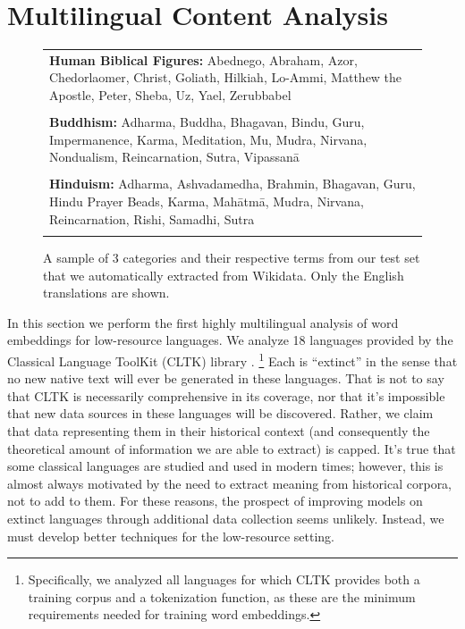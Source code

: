\documentclass[11pt,a4paper]{article}
\newcommand{\fixme}[1]{{\color{red}\itshape \textbf{FIXME:} {#1}}}
\begin{document}
\section{Multilingual Content Analysis}
\label{sec:mca}

\begin{figure}
\itshape
    \begin{tabular}{p{}}
    \textbf{Human Biblical Figures:}
    Abednego,
    Abraham,
    Azor,
    Chedorlaomer,
    Christ,
    Goliath,
    Hilkiah,
    Lo-Ammi,
    Matthew the Apostle,
    Peter,
    Sheba,
    Uz,
    Yael,
    Zerubbabel
    \\
    \\[-4pt]

    \textbf{Buddhism:}
    Adharma,
    Buddha,
    Bhagavan,
    Bindu,
    Guru,
    Impermanence,
    Karma,
    Meditation,
    Mu,
    Mudra,
    Nirvana,
    Nondualism,
    Reincarnation,
    Sutra,
    Vipassanā
    \\
    \\[-4pt]

    \textbf{Hinduism:}
    Adharma,
    Ashvadamedha,
    Brahmin,
    Bhagavan,
    Guru,
    Hindu Prayer Beads,
    Karma,
    Mahātmā,
    Mudra,
    Nirvana,
    Reincarnation,
    Rishi,
    Samadhi,
    Sutra
    \\
    \\[-15pt]
\end{tabular}
\caption{
    A sample of 3 categories and their respective terms from our test set that we automatically extracted from Wikidata.
    Only the English translations are shown.
}
\label{table:wikidata}
\end{figure}


In this section we perform the first highly multilingual analysis of word embeddings for low-resource languages.
We analyze 18 languages provided by the Classical Language ToolKit (CLTK) library \citep{johnson2014}.%
\footnote{
    Specifically, we analyzed all languages for which CLTK provides both a training corpus and a tokenization function,
    as these are the minimum requirements needed for training word embeddings.
}
Each is ``extinct'' in the sense that no new native text will ever be generated in these languages.
That is not to say that CLTK is necessarily comprehensive in its coverage,
nor that it's impossible that new data sources in these languages will be discovered.
Rather, we claim that data representing them in their historical context (and consequently the theoretical amount of information we are able to extract) is capped. 
It's true that some classical languages are studied and used in modern times;
however, this is almost always motivated by the need to extract meaning from historical corpora, not to add to them. For these reasons, the prospect of improving models on extinct languages through additional data collection seems unlikely.
Instead, we must develop better techniques for the low-resource setting.
\end{document}
